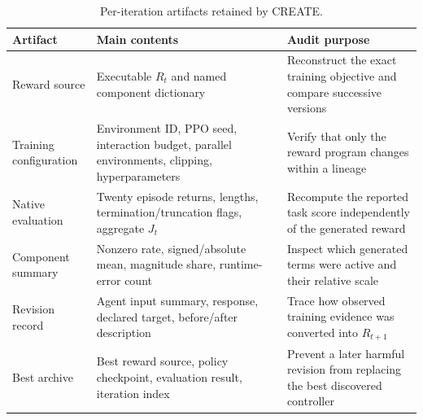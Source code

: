 \begin{table}[t]
\caption{Per-iteration artifacts retained by CREATE.}
\label{tab:audit}
\centering
\scriptsize
\setlength{\tabcolsep}{4.0pt}
\begin{tabular}{p{2.2cm}p{5.3cm}p{8.0cm}}
\toprule
Artifact & Main contents & Audit purpose \\
\midrule
Reward source & Executable $R_t$ and named component dictionary & Reconstruct the exact training objective and compare successive versions \\
Training configuration & Environment ID, PPO seed, interaction budget, parallel environments, clipping, hyperparameters & Verify that only the reward program changes within a lineage \\
Native evaluation & Twenty episode returns, lengths, termination/truncation flags, aggregate $J_t$ & Recompute the reported task score independently of the generated reward \\
Component summary & Nonzero rate, signed/absolute mean, magnitude share, runtime-error count & Inspect which generated terms were active and their relative scale \\
Revision record & Agent input summary, response, declared target, before/after description & Trace how observed training evidence was converted into $R_{t+1}$ \\
Best archive & Best reward source, policy checkpoint, evaluation result, iteration index & Prevent a later harmful revision from replacing the best discovered controller \\
\bottomrule
\end{tabular}
\end{table}
